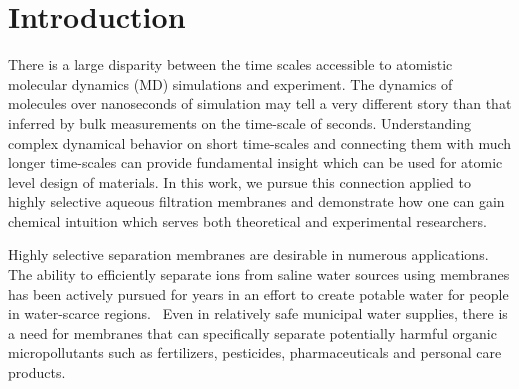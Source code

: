 \documentclass[journal=ancac3,manuscript=article,layout=twocolumn]{achemso}
\begin{document}
  \maketitle
  
  \graphicspath{{./figures/arxiv_figures/}{./supporting_figures/arxiv_figures/}}

  \section{Introduction}

  There is a large disparity between the time scales accessible to atomistic 
  molecular dynamics (MD) simulations and experiment. The dynamics of molecules 
  over nanoseconds of simulation may tell a very different story than that 
  inferred by bulk measurements on the time-scale of seconds. Understanding 
  complex dynamical behavior on short time-scales and connecting them with much
  longer time-scales can provide fundamental insight which can be used for 
  atomic level design of materials. In this work, we pursue this connection 
  applied to highly selective aqueous filtration membranes and demonstrate how
  one can gain chemical intuition which serves both theoretical and experimental
  researchers.

  Highly selective separation membranes are desirable in numerous
  applications. The ability to efficiently separate ions from saline water
  sources using membranes has been actively pursued for years in an effort to
  create potable water for people in water-scarce
  regions.~\cite{werber_materials_2016} Even in relatively safe municipal water
  supplies, there is a need for membranes that can specifically separate
  potentially harmful organic micropollutants such as fertilizers, pesticides,
  pharmaceuticals and personal care products.~\cite{barbosa_occurrence_2016} 
\end{document}
